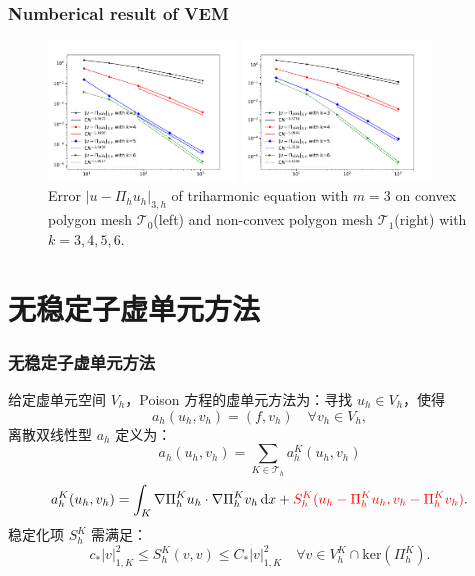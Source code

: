 \documentclass[notheorems,serif]{beamer}
\newcommand{\marking}{\textcolor[rgb]{1.00,0.00,0.00}}
\begin{document}
\begin{frame}
  \frametitle{Numberical result of VEM}
\begin{figure}[htbp]
\centering
\begin{minipage}[t]{0.49\linewidth}
\centering
\includegraphics[width=5cm]{../figures/H3_convex.pdf}
\end{minipage}%
\begin{minipage}[t]{0.49\linewidth}
\centering
\includegraphics[width=5cm]{../figures/H3_nonconvex.pdf}
\end{minipage}%
\centering
\caption{Error $|u - \Pi_h u_h|_{3, h}$ of 
    triharmonic equation with $m=3$ on convex polygon mesh $\mathcal T_0$(left) 
and non-convex polygon mesh $\mathcal T_1$(right) with $k = 3, 4, 5, 6$.}
\label{fig:H3error}
\end{figure}
\end{frame}
\section{无稳定子虚单元方法}
\begin{frame}
\frametitle{无稳定子虚单元方法}
  给定虚单元空间 $V_h$，Poison 方程的虚单元方法为：寻找 $u_h \in V_h$，使得
  $$
  a_h(u_h, v_h) = (f, v_h) \quad \forall v_h \in V_h,
  $$
  离散双线性型 $a_h$ 定义为：
  $$
  a_h(u_h, v_h) = \sum_{K \in \mathcal{T}_h} a_h^K(u_h, v_h)
  $$
  $$
  a_h^K(u_h, v_h) = \int_K \nabla \Pi_h^K u_h \cdot \nabla \Pi_h^K v_h \,
  \mathrm{d} x + \marking{S_h^K(u_h - \Pi_h^K u_h, v_h - \Pi_h^K v_h)}.
  $$
  稳定化项 $S_h^K$ 需满足：
  $$
  c_* |v|_{1, K}^2 \leq S_h^K(v, v) \leq C_* |v|_{1, K}^2 \quad \forall v \in 
  V_h^K \cap \mathrm{ker}(\Pi_h^K).
  $$
\end{frame}
\end{document}
